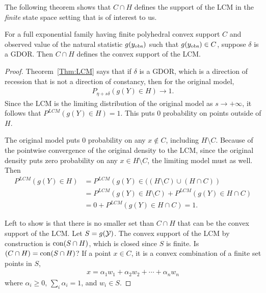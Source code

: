 The following theorem shows that $C \cap H$ defines the support of the LCM 
in the \emph{finite} state space setting that is of interest to us.  
\begin{theorem} \label{Thm:C-H}
For a full exponential family having finite polyhedral convex support $C$ and observed value 
of the natural statistic $g(y_{\text{obs}})$ such that $g(y_{\text{obs}}) \in C$, suppose $\delta$ is a GDOR.
Then $C \cap H$ defines the convex support of the LCM.
\end{theorem}
\begin{proof}
Theorem~\ref{Thm:LCM} says that if $\delta$ is a GDOR, which is a direction of recession
that is not a direction of constancy, then for the original model,
\begin{align*}
	P_{\eta+s\delta}( g(Y) \in H ) \to 1.
\end{align*}
Since the LCM is the limiting distribution of the original model as $s \to +\infty$, it follows that $P^{LCM}(g(Y) \in H) = 1$.  
This puts 0 probability on points outside of $H$.  

The original model puts 0 probability on any $x \notin C$, including $H \setminus C$.  Because of the pointwise convergence of the original density to the LCM, since the original density puts zero probability on any $x \in H \setminus C$, the limiting model must as well.  Then
\begin{align*}
	P^{LCM}(g(Y) \in H) &= P^{LCM} \left( g(Y) \in ( (H \setminus C)  \cup (H \cap C)   \right ) \\
	 			&= P^{LCM} \left( g(Y) \in H \setminus C \right) 
								+ P^{LCM} \left( g(Y) \in H \cap C \right ) \\
	 			&= 0 + P^{LCM} \left( g(Y) \in H \cap C  \right ) = 1.
\end{align*}

Left to show is that there is no smaller set than $C \cap H$ that 
can be the convex support of the LCM.
Let $S = g({\mathcal Y})$.  The convex support of the LCM by construction is $\operatorname{con}(S \cap H)$, 
which is closed since $S$ is finite.  
Is $(C \cap H) = \operatorname{con}(S \cap H)$?
If a point $x \in C$, it is a convex combination of a finite set points in $S$,
\begin{align*}
	x = \alpha_1 w_1 + \alpha_2 w_2 + \cdots + \alpha_n w_n
\end{align*}
where $\alpha_i \geq 0$, $\sum_i \alpha_i = 1$, and $w_i \in S$.


\end{proof}
